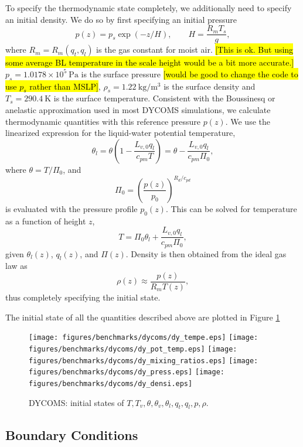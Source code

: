 \documentclass{report}
\begin{document}
To specify the thermodynamic state completely, we additionally need to specify an initial density. We do so by first specifying an initial pressure
\[
p(z) = p_{s} \exp(-z/H), \qquad H = \frac{R_m T_s}{g},
\]
where $R_m = R_m(q_t, q_l)$ is the gas constant for moist air. \hl{[This is ok. But using some average BL temperature in the scale height would be a bit more accurate.]} $p_s = 1.0178\times 10^{5}~\mathrm{Pa}$ is the surface pressure \hl{[would be good to change the code to use $p_s$ rather than MSLP]}, $\rho_s = 1.22~\mathrm{kg/m^3}$ is the surface density and $T_s = 290.4~\mathrm{K}$ is the surface temperature. Consistent with the Boussinesq or anelastic approximation used in most DYCOMS simulations, we calculate thermodynamic quantities with this reference pressure $p(z)$. We use the linearized expression for the liquid-water potential temperature,
\begin{equation}
    \label{e:betts1973}
    \theta_l = \theta \left(1 - \frac{L_{v,0} q_l}{c_{pm} T} \right) = \theta - \frac{L_{v,0} q_l}{c_{pm} \Pi_0},
\end{equation}
where $\theta = T/\Pi_0$, and 
\[
\Pi_0 = \left( \frac{p(z)}{p_0} \right)^{R_d/c_{pd}}
\]
is evaluated with the pressure profile $p_0(z)$. This can be solved for temperature as a function of height $z$,
\[
T = \Pi_0 \theta_l + \frac{L_{v,0} q_l}{c_{pm} \Pi_0},
\]
given $\theta_l(z)$, $q_l(z)$, and $\Pi(z)$. Density is then obtained from the ideal gas law as
\[
\rho(z) \approx \frac{p(z)}{R_m T(z)},
\]
thus completely specifying the initial state. 

The initial state of all the quantities described above are plotted in Figure \ref{dycomsInitFig}
\begin{figure}
    \centering
	\texttt{[image: figures/benchmarks/dycoms/dy\_tempe.eps]}
	\texttt{[image: figures/benchmarks/dycoms/dy\_pot\_temp.eps]}
	\texttt{[image: figures/benchmarks/dycoms/dy\_mixing\_ratios.eps]}
	\texttt{[image: figures/benchmarks/dycoms/dy\_press.eps]}
	\texttt{[image: figures/benchmarks/dycoms/dy\_densi.eps]}
      \caption{DYCOMS: initial states of $T, T_v, \theta, \theta_v, \theta_l, q_t, q_l, p, \rho$.}
\label{dycomsInitFig}
\end{figure}

\subsection{Boundary Conditions}
\end{document}
